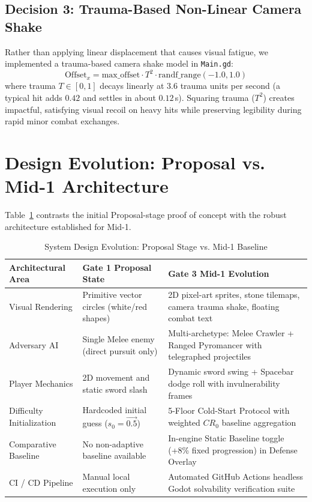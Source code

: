 \subsection{Decision 3: Trauma-Based Non-Linear Camera Shake}
Rather than applying linear displacement that causes visual fatigue, we implemented a trauma-based camera shake model in \texttt{Main.gd}:
\begin{equation}
\text{Offset}_x = \text{max\_offset} \cdot T^2 \cdot \text{randf\_range}(-1.0, 1.0)
\label{eq:trauma}
\end{equation}
where trauma $T \in [0, 1]$ decays linearly at $3.6$ trauma units per second (a typical hit adds $0.42$ and settles in about $0.12$\,s). Squaring trauma ($T^2$) creates impactful, satisfying visual recoil on heavy hits while preserving legibility during rapid minor combat exchanges.

\section{Design Evolution: Proposal vs. Mid-1 Architecture}
Table~\ref{tab:design_evolution} contrasts the initial Proposal-stage proof of concept with the robust architecture established for Mid-1.

\begin{table}[!htbp]
\centering
\caption{System Design Evolution: Proposal Stage vs. Mid-1 Baseline}
\label{tab:design_evolution}
\small
\begin{tabular}{p{}p{}p{}}
\toprule
\textbf{Architectural Area} & \textbf{Gate 1 Proposal State} & \textbf{Gate 3 Mid-1 Evolution} \\
\midrule
Visual Rendering & Primitive vector circles (white/red shapes) & 2D pixel-art sprites, stone tilemaps, camera trauma shake, floating combat text \\
Adversary AI & Single Melee enemy (direct pursuit only) & Multi-archetype: Melee Crawler + Ranged Pyromancer with telegraphed projectiles \\
Player Mechanics & 2D movement and static sword slash & Dynamic sword swing + Spacebar dodge roll with invulnerability frames \\
Difficulty Initialization & Hardcoded initial guess ($s_0 = \vec{0.5}$) & 5-Floor Cold-Start Protocol with weighted $CR_0$ baseline aggregation \\
Comparative Baseline & No non-adaptive baseline available & In-engine Static Baseline toggle (+8\% fixed progression) in Defense Overlay \\
CI / CD Pipeline & Manual local execution only & Automated GitHub Actions headless Godot solvability verification suite \\
\bottomrule
\end{tabular}
\end{table}

